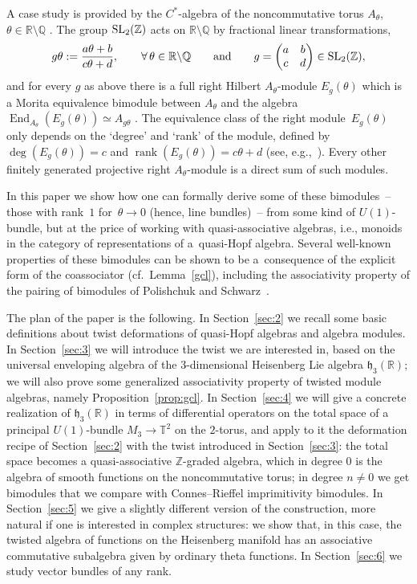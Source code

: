 \documentclass[pdftex]{sigma}
\numberwithin{equation}{section}
\theoremstyle{definition}
\newcommand{\Q}{\mathbb{Q}}
\newcommand{\R}{\mathbb{R}}
\newcommand{\Z}{\mathbb{Z}}
\newcommand{\T}{\mathbb{T}}
\newcommand{\mf}{\mathfrak}
\begin{document}
A case study is provided by the $C^*$-algebra of the noncommutative torus $A_\theta$, $\theta\in\R{\setminus}\Q$ \cite{Con80,Rie81}.
The group ${\rm SL}_2(\Z)$ acts on $\R{\setminus}\Q$ by fractional linear transformations,
\begin{gather}\label{eq:gtheta}
g\theta :=\frac{a\theta+b}{c\theta+d}
 ,\qquad\forall\,\theta\in\R{\setminus}\Q
\qquad\text{and}\qquad g=
 \begin{pmatrix} a & b \\ c & d \end{pmatrix}
\in {\rm SL}_2(\Z) ,
\end{gather}
and for every $g$ as above there is a full right Hilbert $A_\theta$-module $E_g(\theta)$ which is a Morita equiva\-len\-ce bimodule between $A_\theta$ and the algebra $\operatorname{End}_{A_\theta}(E_g(\theta))\simeq A_{g\theta}$ \cite{Con80,Rie83}.
The equivalence class of the right module~$E_g(\theta)$ only depends on the `degree' and `rank' of the module, def\/ined by
$\deg (E_g(\theta))=c$ and $\operatorname{rank}(E_g(\theta))=c\theta+d$ (see, e.g.,~\cite{PS02}). Every other f\/initely generated projective right $A_\theta$-module is a direct sum of such modules.

In this paper we show how one can formally derive some of these bimodules~-- those with rank~$1$ for~$\theta\to 0$ (hence, line bundles)~-- from some kind of $U(1)$-bundle, but at the price of working with quasi-associative algebras, i.e., monoids in the category of representations of a~quasi-Hopf algebra.
Several well-known properties of these bimodules can be shown to be a~consequence of the explicit form of the coassociator (cf.~Lemma~\ref{gcl}), including the associativity property of the pairing of bimodules of Polishchuk and Schwarz~\cite{PS02}.

The plan of the paper is the following. In Section~\ref{sec:2} we recall some basic def\/initions about twist deformations of quasi-Hopf algebras and algebra modules. In Section~\ref{sec:3} we will introduce the twist we are interested in, based on the universal enveloping algebra of the $3$-dimensional Heisenberg Lie algebra $\mf{h}_3(\R)$; we will also prove some generalized associativity property of twisted module algebras, namely Proposition~\ref{prop:gcl}. In Section~\ref{sec:4} we will give a concrete realization of $\mf{h}_3(\R)$ in terms of dif\/ferential operators on the total space of a principal $U(1)$-bundle $M_3\to\T^2$ on the $2$-torus, and apply to it the deformation recipe of Section~\ref{sec:2} with the twist introduced in Section~\ref{sec:3}: the total space becomes a quasi-associative $\Z$-graded algebra, which in degree $0$ is the algebra of smooth functions on the noncommutative torus; in degree $n\neq 0$ we get bimodules that we compare with Connes--Rief\/fel imprimitivity bimodules.
In Section~\ref{sec:5} we give a slightly dif\/ferent version of the construction, more natural if one is interested in complex structures: we show that, in this case, the twisted algebra of functions on the Heisenberg manifold has an associative commutative subalgebra given by ordinary theta functions.
In Section~\ref{sec:6} we study vector bundles of any rank.
\end{document}
